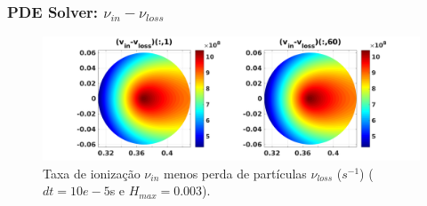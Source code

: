 \documentclass[aspectratio=169]{beamer}
\begin{document}
	\begin{frame}
			\frametitle{PDE Solver: $\nu_{in}-\nu_{loss}$}
\begin{figure}[H]
\centering
\includegraphics[width=.9\linewidth]{../SImulacao_breakdown/PDE/vinvloss1.png}  
\caption{Taxa de ionização $\nu_{in}$ menos perda de partículas $\nu_{loss}$ ($s^{-1}$) ($dt=10e-5$s e $H_{max} = 0.003$).}
\label{vinn3}
\end{figure}	
	\end{frame}
	
	
\end{document}
